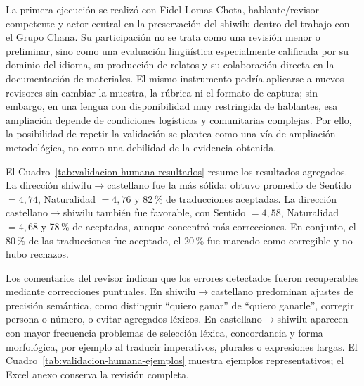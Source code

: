 \documentclass[12pt,a4paper,oneside]{book}
\begin{document}
La primera ejecución se realizó con Fidel Lomas Chota, hablante/revisor competente y actor central en la preservación del shiwilu dentro del trabajo con el Grupo Chana. Su participación no se trata como una revisión menor o preliminar, sino como una evaluación lingüística especialmente calificada por su dominio del idioma, su producción de relatos y su colaboración directa en la documentación de materiales. El mismo instrumento podría aplicarse a nuevos revisores sin cambiar la muestra, la rúbrica ni el formato de captura; sin embargo, en una lengua con disponibilidad muy restringida de hablantes, esa ampliación depende de condiciones logísticas y comunitarias complejas. Por ello, la posibilidad de repetir la validación se plantea como una vía de ampliación metodológica, no como una debilidad de la evidencia obtenida.

El Cuadro~\ref{tab:validacion-humana-resultados} resume los resultados agregados. La dirección shiwilu\(\rightarrow\)castellano fue la más sólida: obtuvo promedio de Sentido \(=4{,}74\), Naturalidad \(=4{,}76\) y 82\,\% de traducciones aceptadas. La dirección castellano\(\rightarrow\)shiwilu también fue favorable, con Sentido \(=4{,}58\), Naturalidad \(=4{,}68\) y 78\,\% de aceptadas, aunque concentró más correcciones. En conjunto, el 80\,\% de las traducciones fue aceptado, el 20\,\% fue marcado como corregible y no hubo rechazos.

\begin{table}[h]
\centering
\caption{Resultados agregados de la primera validación participativa.}
\label{tab:validacion-humana-resultados}
\end{table}

Los comentarios del revisor indican que los errores detectados fueron recuperables mediante correcciones puntuales. En shiwilu\(\rightarrow\)castellano predominan ajustes de precisión semántica, como distinguir ``quiero ganar'' de ``quiero ganarle'', corregir persona o número, o evitar agregados léxicos. En castellano\(\rightarrow\)shiwilu aparecen con mayor frecuencia problemas de selección léxica, concordancia y forma morfológica, por ejemplo al traducir imperativos, plurales o expresiones largas. El Cuadro~\ref{tab:validacion-humana-ejemplos} muestra ejemplos representativos; el Excel anexo conserva la revisión completa.
\end{document}
